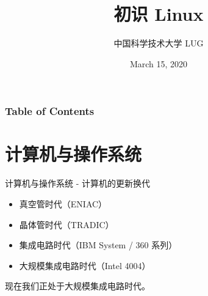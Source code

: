 \documentclass[UTF8]{ctexbeamer}
\title{初识 Linux}
\author{中国科学技术大学 LUG}
\date{March 15, 2020}
\begin{document}
\frame{\titlepage}
\begin{frame}
	\frametitle{Table of Contents}
	\tableofcontents
\end{frame}

\section{计算机与操作系统}
\begin{frame}{计算机与操作系统 - 计算机的更新换代}
    \begin{itemize}
        \item 真空管时代（ENIAC） \pause
        \item 晶体管时代（TRADIC） \pause
        \item 集成电路时代（IBM System / 360 系列） \pause
        \item 大规模集成电路时代（Intel 4004） \pause
    \end{itemize}
    现在我们正处于大规模集成电路时代。
\end{frame}
\end{document}
